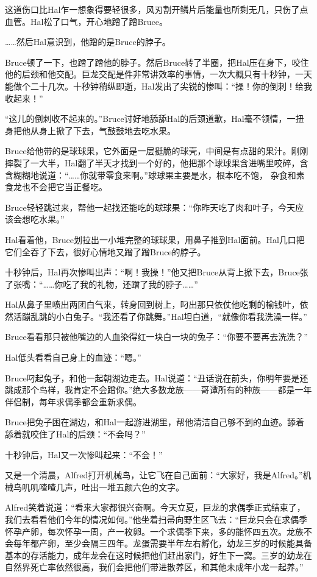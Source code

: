 \documentclass[../main.tex]{subfiles}
\begin{document}
这道伤口比Hal乍一想象得要轻很多，风刃割开鳞片后能量也所剩无几，只伤了点血管。Hal松了口气，开心地蹭了蹭Bruce。

\ldots\ldots 然后Hal意识到，他蹭的是Bruce的脖子。

Bruce顿了一下，也蹭了蹭他的脖子。然后Bruce转了半圈，把Hal压在身下，咬住他的后颈和他交配。巨龙交配是件非常讲效率的事情，一次大概只有十秒钟，一天能做个二十几次。十秒钟稍纵即逝，Hal发出了尖锐的惨叫：``操！你的倒刺！给我收起来！''

``这儿的倒刺收不起来的。''Bruce讨好地舔舔Hal的后颈道歉，Hal毫不领情，一扭身把他从身上掀了下去，气鼓鼓地去吃水果。

Bruce给他带的是球球果，它外面是一层挺脆的球壳，中间是有点甜的果汁。刚刚摔裂了一大半，Hal翻了半天才找到一个好的，他把那个球球果含进嘴里咬碎，含含糊糊地说道：``\ldots\ldots 你就带零食来啊。''球球果主要是水，根本吃不饱，
杂食和素食龙也不会把它当正餐吃。

Bruce轻轻跳过来，帮他一起找还能吃的球球果：``你昨天吃了肉和叶子，今天应该会想吃水果。''

Hal看着他，Bruce划拉出一小堆完整的球球果，用鼻子推到Hal面前。Hal几口把它们全吞了下去，很好心情地又蹭了蹭Bruce的脖子。

十秒钟后，Hal再次惨叫出声：``啊！我操！''他又把Bruce从背上掀下去，Bruce张了张嘴：``\ldots\ldots 你吃了我的礼物，还蹭了我的脖子\ldots\ldots''

Hal从鼻子里喷出两团白气来，转身回到树上，叼出那只依仗他吃剩的榆钱叶，依然活蹦乱跳的小白兔子。``我还看了你跳舞。''Hal坦白道，``就像你看我洗澡一样。''

Bruce看看那只被他嘴边的人血染得红一块白一块的兔子：``你要不要再去洗洗？''

Hal低头看看自己身上的血迹：``嗯。''

Bruce叼起兔子，和他一起朝湖边走去。Hal说道：``丑话说在前头，你明年要是还跳成那个鸟样，我肯定不会蹭你。''绝大多数龙族------哥谭所有的种族------都是一年伴侣制，每年求偶季都会重新求偶。

Bruce把兔子困在湖边，和Hal一起游进湖里，帮他清洁自己够不到的血迹。舔着舔着就咬住了Hal的后颈：``不会吗？''

十秒钟后，Hal又一次惨叫起来：``不会！''

又是一个清晨，Alfred打开机械鸟，让它飞在自己面前：``大家好，我是Alfred。''机械鸟叽叽喳喳几声，吐出一堆五颜六色的文字。

Alfred笑着说道：``看来大家都很兴奋啊。今天立夏，巨龙的求偶季正式结束了，我们去看看他们今年的情况如何。''他坐着扫帚向野生区飞去：``巨龙只会在求偶季怀孕产卵，每次怀孕一周，产一枚卵。一个求偶季下来，多的能怀四五次。龙族不会每年都产卵，至少会隔三四年。龙蛋需要半年左右孵化，幼龙三岁的时候能具备基本的存活能力，成年龙会在这时候把他们赶出家门，好生下一窝。三岁的幼龙在自然界死亡率依然很高，我们会把他们带进散养区，和其他未成年小龙一起养。''
\end{document}
